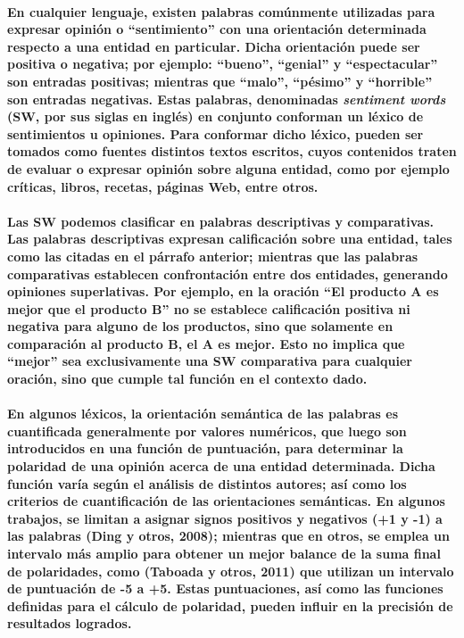 \paragraph{En cualquier lenguaje, existen palabras com\'unmente utilizadas para expresar opini\'on o ``sentimiento'' con una orientaci\'on determinada respecto a una entidad en particular. Dicha orientaci\'on puede ser positiva o negativa; por ejemplo: ``bueno'', ``genial'' y ``espectacular'' son entradas positivas; mientras que ``malo'', ``p\'esimo'' y ``horrible'' son entradas negativas. Estas palabras, denominadas \textit{sentiment words} (SW, por sus siglas en ingl\'es) en conjunto conforman un l\'exico de sentimientos u opiniones. Para conformar dicho l\'exico, pueden ser tomados como fuentes distintos textos escritos, cuyos contenidos traten de evaluar o expresar opini\'on sobre alguna entidad, como por ejemplo cr\'iticas, libros, recetas, p\'aginas Web, entre otros.} 
\paragraph{Las SW podemos clasificar en palabras descriptivas y comparativas. Las palabras descriptivas expresan calificaci\'on sobre una entidad, tales como las citadas en el p\'arrafo anterior; mientras que las palabras comparativas establecen confrontaci\'on entre dos entidades, generando opiniones superlativas. Por ejemplo, en la oraci\'on ``El producto A es mejor que el producto B'' no se establece calificaci\'on positiva ni negativa para alguno de los productos, sino que solamente en comparaci\'on al producto B, el A es mejor. Esto no implica que ``mejor'' sea exclusivamente una SW comparativa para cualquier oraci\'on, sino que cumple tal funci\'on en el contexto dado.}
\paragraph{En algunos l\'exicos, la orientaci\'on sem\'antica de las palabras es cuantificada generalmente por valores num\'ericos, que luego son introducidos en una funci\'on de puntuaci\'on, para determinar la polaridad de una opini\'on acerca de una entidad determinada. Dicha funci\'on var\'ia seg\'un el an\'alisis de distintos autores; as\'i como los criterios de cuantificaci\'on de las orientaciones sem\'anticas. En algunos trabajos, se limitan a asignar signos positivos y negativos (+1 y -1) a las palabras (Ding y otros, 2008); mientras que en otros, se emplea un intervalo m\'as amplio para obtener un mejor balance de la suma final de polaridades, como (Taboada y otros, 2011) que utilizan un intervalo de puntuaci\'on de -5 a +5. Estas puntuaciones, as\'i como las funciones definidas para el c\'alculo de polaridad, pueden influir en la precisi\'on de resultados logrados.}
